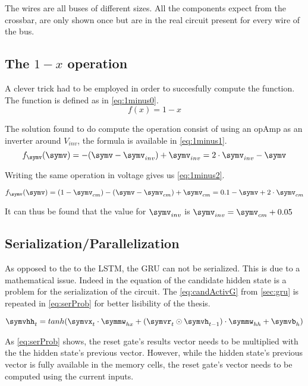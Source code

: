 The wires are all buses of different sizes. All the components expect from the crossbar, are only shown once but are in the real circuit present for every wire of the bus.

\subsection{The $1-x$ operation}

A clever trick had to be employed in order to succesfully compute the function. The function is defined as in \cref{eq:1minus0}.
\begin{equation}\label{eq:1minus0}
  f(x)=1-x
\end{equation}

The solution found to do compute the operation consist of using an \ac{opAmp} as an inverter around $V_{inv}$, the formula is available in \cref{eq:1minus1}.
\begin{equation}\label{eq:1minus1}
  f_\symv(\symv)=-(\symv-\symv_{inv})+\symv_{inv}=2\cdot \symv_{inv} -\symv
\end{equation}

Writing the same operation in voltage gives us \cref{eq:1minus2}.

\begin{equation}\label{eq:1minus2}
  f_\symv(\symv)=(1-\symv_{cm})-(\symv-\symv_{cm})+\symv_{cm}= 0.1-\symv+2\cdot \symv_{cm}
\end{equation}

It can thus be found that the value for $\symv_{inv}$ is $\symv_{inv}=\symv_{cm}+0.05$

\subsection{Serialization/Parallelization}
\label{subsec:gruSerPar}

As opposed to the to the \ac{LSTM}, the \ac{GRU} can not be serialized. This is due to a mathematical issue. Indeed in the equation of the candidate hidden state is a problem for the serialization of the circuit. The \cref{eq:candActivG} from \cref{sec:gru} is repeated in \cref{eq:serProb} for better lisibility of the thesis.

\begin{equation}\label{eq:serProb}
  \symvhh_t=tanh(\symvx_t\cdot \symmw_{hx}+(\symvr_t\odot\symvh_{t-1}) \cdot \symmw_{hh} + \symvb_h)
\end{equation}

As \cref{eq:serProb} shows, the reset gate's results vector needs to be multiplied with the the hidden state's previous vector. However, while the hidden state's previous vector is fully available in the memory cells, the reset gate's vector needs to be computed using the current inputs.

